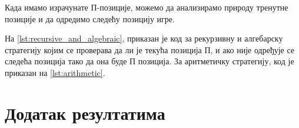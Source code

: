 \documentclass[a4paper]{article}
\begin{document}
Када имамо израчунате П-позиције, можемо да анализирамо природу тренутне позиције и да одредимо следећу позицију игре.

На \ref{lst:recursive_and_algebraic}, приказан је код за рекурзивну и алгебарску стратегију којим се проверава да ли је текућа позиција П, и ако није одређује се следећа позиција тако да она буде П позиција.
За аритметичку стратегију, код је приказан на \ref{lst:arithmetic}.





\newpage
\appendix
\section{Додатак резултатима}



\newpage
{}
\appendix
 

\end{document}
